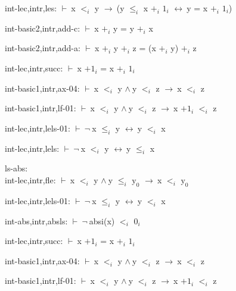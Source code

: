 \documentclass[a4paper]{article}
\newcommand{\Fol}{\mbox{$\vdash\ $}}
\newcommand{\Not}{\mbox{$\neg\ $}}
\newcommand{\And}{\mbox{$\wedge\ $}}
\newcommand{\Imp}{\mbox{$\rightarrow\ $}}
\newcommand{\Equiv}{\mbox{$\leftrightarrow\ $}}
\begin{document}
int-lec,intr,les: 
 \Fol x $\mbox{$<$}_{i}$ y \Imp (y $\mbox{$\le$}_{i}$ x $\mbox{+}_{i}$ $\mbox{1}_{i}$ \Equiv y = x $\mbox{+}_{i}$ $\mbox{1}_{i}$)



int-basic2,intr,add-c: 
 \Fol x $\mbox{+}_{i}$ y = y $\mbox{+}_{i}$ x



int-basic2,intr,add-a: 
 \Fol x $\mbox{+}_{i}$ y $\mbox{+}_{i}$ z = (x $\mbox{+}_{i}$ y) $\mbox{+}_{i}$ z



int-lec,intr,succ: 
 \Fol x $\mbox{+1}_{i}$ = x $\mbox{+}_{i}$ $\mbox{1}_{i}$



int-basic1,intr,ax-04: 
 \Fol x $\mbox{$<$}_{i}$ y \And y $\mbox{$<$}_{i}$ z \Imp x $\mbox{$<$}_{i}$ z



int-basic1,intr,lf-01: 
 \Fol x $\mbox{$<$}_{i}$ y \And y $\mbox{$<$}_{i}$ z \Imp x $\mbox{+1}_{i}$ $\mbox{$<$}_{i}$ z



int-lec,intr,lels-01: 
 \Fol \Not x $\mbox{$\le$}_{i}$ y \Equiv y $\mbox{$<$}_{i}$ x



int-lec,intr,lels: 
 \Fol \Not x $\mbox{$<$}_{i}$ y \Equiv y $\mbox{$\le$}_{i}$ x



\bigskip

ls-abs:\\ int-lec,intr,fle: 
 \Fol x $\mbox{$<$}_{i}$ y \And y $\mbox{$\le$}_{i}$ $\mbox{y}_{0}$ \Imp x $\mbox{$<$}_{i}$ $\mbox{y}_{0}$



int-lec,intr,lels-01: 
 \Fol \Not x $\mbox{$\le$}_{i}$ y \Equiv y $\mbox{$<$}_{i}$ x



int-abs,intr,absls: 
 \Fol \Not absi(x) $\mbox{$<$}_{i}$ $\mbox{0}_{i}$



int-lec,intr,succ: 
 \Fol x $\mbox{+1}_{i}$ = x $\mbox{+}_{i}$ $\mbox{1}_{i}$



int-basic1,intr,ax-04: 
 \Fol x $\mbox{$<$}_{i}$ y \And y $\mbox{$<$}_{i}$ z \Imp x $\mbox{$<$}_{i}$ z



int-basic1,intr,lf-01: 
 \Fol x $\mbox{$<$}_{i}$ y \And y $\mbox{$<$}_{i}$ z \Imp x $\mbox{+1}_{i}$ $\mbox{$<$}_{i}$ z
\end{document}
